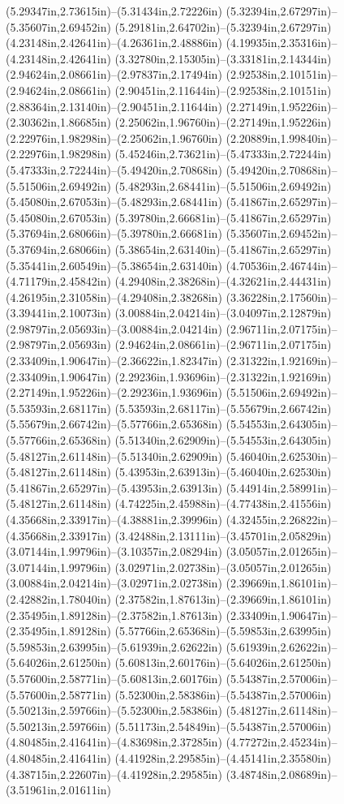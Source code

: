 (5.29347in,2.73615in)--(5.31434in,2.72226in) (5.32394in,2.67297in)--(5.35607in,2.69452in) (5.29181in,2.64702in)--(5.32394in,2.67297in) (4.23148in,2.42641in)--(4.26361in,2.48886in) (4.19935in,2.35316in)--(4.23148in,2.42641in) (3.32780in,2.15305in)--(3.33181in,2.14344in) (2.94624in,2.08661in)--(2.97837in,2.17494in) (2.92538in,2.10151in)--(2.94624in,2.08661in) (2.90451in,2.11644in)--(2.92538in,2.10151in) (2.88364in,2.13140in)--(2.90451in,2.11644in) (2.27149in,1.95226in)--(2.30362in,1.86685in) (2.25062in,1.96760in)--(2.27149in,1.95226in) (2.22976in,1.98298in)--(2.25062in,1.96760in) (2.20889in,1.99840in)--(2.22976in,1.98298in) (5.45246in,2.73621in)--(5.47333in,2.72244in) (5.47333in,2.72244in)--(5.49420in,2.70868in) (5.49420in,2.70868in)--(5.51506in,2.69492in) (5.48293in,2.68441in)--(5.51506in,2.69492in) (5.45080in,2.67053in)--(5.48293in,2.68441in) (5.41867in,2.65297in)--(5.45080in,2.67053in) (5.39780in,2.66681in)--(5.41867in,2.65297in) (5.37694in,2.68066in)--(5.39780in,2.66681in) (5.35607in,2.69452in)--(5.37694in,2.68066in) (5.38654in,2.63140in)--(5.41867in,2.65297in) (5.35441in,2.60549in)--(5.38654in,2.63140in) (4.70536in,2.46744in)--(4.71179in,2.45842in) (4.29408in,2.38268in)--(4.32621in,2.44431in) (4.26195in,2.31058in)--(4.29408in,2.38268in) (3.36228in,2.17560in)--(3.39441in,2.10073in) (3.00884in,2.04214in)--(3.04097in,2.12879in) (2.98797in,2.05693in)--(3.00884in,2.04214in) (2.96711in,2.07175in)--(2.98797in,2.05693in) (2.94624in,2.08661in)--(2.96711in,2.07175in) (2.33409in,1.90647in)--(2.36622in,1.82347in) (2.31322in,1.92169in)--(2.33409in,1.90647in) (2.29236in,1.93696in)--(2.31322in,1.92169in) (2.27149in,1.95226in)--(2.29236in,1.93696in) (5.51506in,2.69492in)--(5.53593in,2.68117in) (5.53593in,2.68117in)--(5.55679in,2.66742in) (5.55679in,2.66742in)--(5.57766in,2.65368in) (5.54553in,2.64305in)--(5.57766in,2.65368in) (5.51340in,2.62909in)--(5.54553in,2.64305in) (5.48127in,2.61148in)--(5.51340in,2.62909in) (5.46040in,2.62530in)--(5.48127in,2.61148in) (5.43953in,2.63913in)--(5.46040in,2.62530in) (5.41867in,2.65297in)--(5.43953in,2.63913in) (5.44914in,2.58991in)--(5.48127in,2.61148in) (4.74225in,2.45988in)--(4.77438in,2.41556in) (4.35668in,2.33917in)--(4.38881in,2.39996in) (4.32455in,2.26822in)--(4.35668in,2.33917in) (3.42488in,2.13111in)--(3.45701in,2.05829in) (3.07144in,1.99796in)--(3.10357in,2.08294in) (3.05057in,2.01265in)--(3.07144in,1.99796in) (3.02971in,2.02738in)--(3.05057in,2.01265in) (3.00884in,2.04214in)--(3.02971in,2.02738in) (2.39669in,1.86101in)--(2.42882in,1.78040in) (2.37582in,1.87613in)--(2.39669in,1.86101in) (2.35495in,1.89128in)--(2.37582in,1.87613in) (2.33409in,1.90647in)--(2.35495in,1.89128in) (5.57766in,2.65368in)--(5.59853in,2.63995in) (5.59853in,2.63995in)--(5.61939in,2.62622in) (5.61939in,2.62622in)--(5.64026in,2.61250in) (5.60813in,2.60176in)--(5.64026in,2.61250in) (5.57600in,2.58771in)--(5.60813in,2.60176in) (5.54387in,2.57006in)--(5.57600in,2.58771in) (5.52300in,2.58386in)--(5.54387in,2.57006in) (5.50213in,2.59766in)--(5.52300in,2.58386in) (5.48127in,2.61148in)--(5.50213in,2.59766in) (5.51173in,2.54849in)--(5.54387in,2.57006in) (4.80485in,2.41641in)--(4.83698in,2.37285in) (4.77272in,2.45234in)--(4.80485in,2.41641in) (4.41928in,2.29585in)--(4.45141in,2.35580in) (4.38715in,2.22607in)--(4.41928in,2.29585in) (3.48748in,2.08689in)--(3.51961in,2.01611in) 